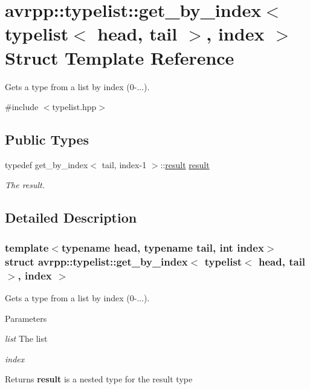 \hypertarget{structavrpp_1_1typelist_1_1get__by__index_3_01typelist_3_01head_00_01tail_01_4_00_01index_01_4}{
\section{avrpp::typelist::get\_\-by\_\-index$<$ typelist$<$ head, tail $>$, index $>$ Struct Template Reference}
\label{structavrpp_1_1typelist_1_1get__by__index_3_01typelist_3_01head_00_01tail_01_4_00_01index_01_4}
}


Gets a type from a list by index (0-\/...).  




{\ttfamily \#include $<$typelist.hpp$>$}

\subsection*{Public Types}
\begin{DoxyCompactItemize}
\item 
typedef get\_\-by\_\-index$<$ tail, index-\/1 $>$::\hyperlink{structavrpp_1_1typelist_1_1get__by__index_3_01typelist_3_01head_00_01tail_01_4_00_01index_01_4_ad6017322d8f1e7d9ab87f74756984f0e}{result} \hyperlink{structavrpp_1_1typelist_1_1get__by__index_3_01typelist_3_01head_00_01tail_01_4_00_01index_01_4_ad6017322d8f1e7d9ab87f74756984f0e}{result}
\begin{DoxyCompactList}\small\item\em The result. \item\end{DoxyCompactList}\end{DoxyCompactItemize}


\subsection{Detailed Description}
\subsubsection*{template$<$typename head, typename tail, int index$>$ struct avrpp::typelist::get\_\-by\_\-index$<$ typelist$<$ head, tail $>$, index $>$}

Gets a type from a list by index (0-\/...). 
\begin{DoxyParams}{Parameters}
\item[{\em list}]The list \item[{\em index}]\end{DoxyParams}
\begin{DoxyReturn}{Returns}
{\bfseries result} is a nested type for the result type 
\end{DoxyReturn}


